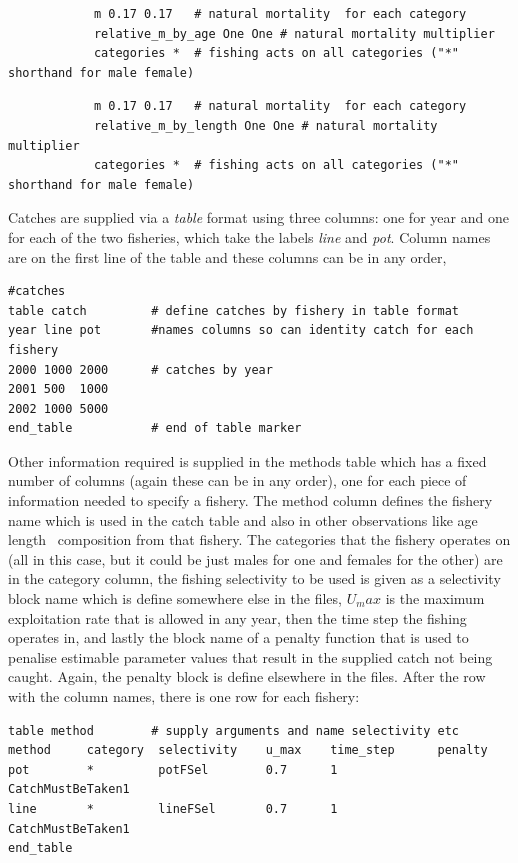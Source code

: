 \ifAgeBased 
{\small{\begin{verbatim}
			m 0.17 0.17   # natural mortality  for each category
			relative_m_by_age One One # natural mortality multiplier
			categories *  # fishing acts on all categories ("*" shorthand for male female)
\end{verbatim}}}
\else 
{\small{\begin{verbatim}
			m 0.17 0.17   # natural mortality  for each category
			relative_m_by_length One One # natural mortality multiplier
			categories *  # fishing acts on all categories ("*" shorthand for male female)
\end{verbatim}}}
\fi

Catches are supplied via a \textit{table} format using three columns: one for year and one for each of the two fisheries, which take the labels \textit{line} and \textit{pot}. Column names are on the first line of the table and these columns can be in any order,

{\small{\begin{verbatim}
#catches
table catch         # define catches by fishery in table format
year line pot       #names columns so can identity catch for each fishery
2000 1000 2000      # catches by year
2001 500  1000
2002 1000 5000
end_table           # end of table marker
\end{verbatim}}}

Other information required is supplied in the methods table which has a fixed number of columns (again these can be in any order), one for each piece of information needed to specify a fishery. The method column defines the fishery name which is used in the catch table and also in other observations like \ifAgeBased age \else length \fi \ composition from that fishery. The categories that the fishery operates on (all in this case, but it could be just males for one and females for the other) are in the category column, the fishing selectivity to be used is given as a selectivity block name which is define somewhere else in the files, $U_max$ is the maximum exploitation rate that is allowed in any year, then the time step the fishing operates in, and lastly the block name of a penalty function that is used to penalise estimable parameter values that result in the supplied catch not being caught. Again, the penalty block is define elsewhere in the files. After the row with the column names, there is one row for each fishery:

{\small{\begin{verbatim}
table method        # supply arguments and name selectivity etc
method     category  selectivity    u_max    time_step      penalty
pot        *         potFSel        0.7      1              CatchMustBeTaken1
line       *         lineFSel       0.7      1              CatchMustBeTaken1
end_table
\end{verbatim}}}

